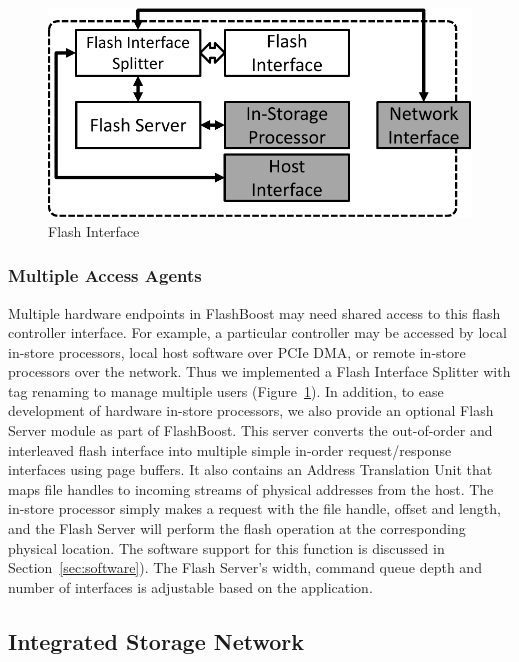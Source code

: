 \begin{figure}[h]
	\begin{center}
	\includegraphics[scale=0.4]{figures/architecture_flash-crop.pdf}
	\caption{Flash Interface}
	\label{fig:flashinterface}
	\end{center}
\end{figure}

\subsubsection{Multiple Access Agents}

Multiple hardware endpoints in FlashBoost may need shared access to this
flash controller interface. For example, a particular controller may
be accessed by local in-store processors, local host software over PCIe
DMA, or remote in-store processors over the network. Thus we implemented a
Flash Interface Splitter with tag renaming to manage multiple users
(Figure~\ref{fig:flashinterface}). In addition, 
to ease development of hardware in-store processors,
we also provide an optional Flash Server module as part of FlashBoost. This server
converts the out-of-order and interleaved flash interface into
multiple simple in-order request/response interfaces
using page buffers. It also contains an Address Translation Unit that 
maps file handles to incoming streams of physical addresses from the host. The in-store processor
simply makes a request with the file handle, offset and length, and the Flash Server will perform
the flash operation at the corresponding physical location. The software
support for this function is discussed in Section~\ref{sec:software}). The Flash
Server's width, command queue depth and number of interfaces is adjustable 
based on the application.

\subsection{Integrated Storage Network}

